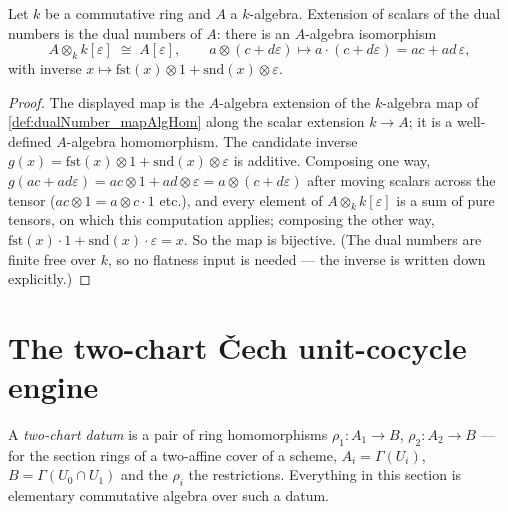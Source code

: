 \begin{theorem}
  \label{thm:dualNumber_baseChange}
  \leanok
  Let \(k\) be a commutative ring and \(A\) a \(k\)-algebra. Extension of scalars of
  the dual numbers is the dual numbers of \(A\): there is an \(A\)-algebra isomorphism
  \[
    A \otimes_k k[\varepsilon] \;\cong\; A[\varepsilon], \qquad
    a \otimes (c + d\varepsilon) \longmapsto a \cdot (c + d\varepsilon)
      = ac + ad\,\varepsilon,
  \]
  with inverse \(x \mapsto \mathrm{fst}(x) \otimes 1 + \mathrm{snd}(x) \otimes
  \varepsilon\).
\end{theorem}
\begin{proof}
  \leanok
  The displayed map is the \(A\)-algebra extension of the \(k\)-algebra map of
  \ref{def:dualNumber_mapAlgHom} along the scalar extension \(k \to A\); it is a
  well-defined \(A\)-algebra homomorphism. The candidate inverse
  \(g(x) = \mathrm{fst}(x) \otimes 1 + \mathrm{snd}(x) \otimes \varepsilon\) is
  additive. Composing one way,
  \(g(ac + ad\varepsilon) = ac \otimes 1 + ad \otimes \varepsilon =
  a \otimes (c + d\varepsilon)\) after moving scalars across the tensor
  (\(ac \otimes 1 = a \otimes c\cdot 1\) etc.), and every element of
  \(A \otimes_k k[\varepsilon]\) is a sum of pure tensors, on which this computation
  applies; composing the other way,
  \(\mathrm{fst}(x)\cdot 1 + \mathrm{snd}(x)\cdot\varepsilon = x\). So the map is
  bijective. (The dual numbers are finite free over \(k\), so no flatness input is
  needed --- the inverse is written down explicitly.)
\end{proof}

\section{The two-chart \v{C}ech unit-cocycle engine}

A \emph{two-chart datum} is a pair of ring homomorphisms \(\rho_1 : A_1 \to B\),
\(\rho_2 : A_2 \to B\) --- for the section rings of a two-affine cover of a scheme,
\(A_i = \Gamma(U_i)\), \(B = \Gamma(U_0 \cap U_1)\) and the \(\rho_i\) the restrictions.
Everything in this section is elementary commutative algebra over such a datum.

